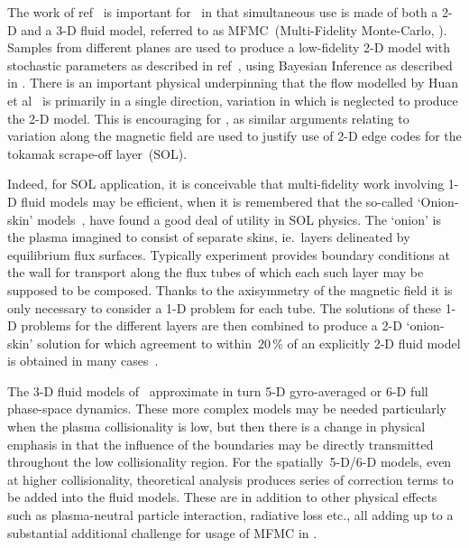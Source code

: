 The work of ref~\cite{Hu18Glob} is important for \nep\ in that simultaneous use is made
of both a 2-D and a 3-D fluid model, referred to as MFMC~(Multi-Fidelity Monte-Carlo, ).
Samples from different planes are used to produce a low-fidelity 2-D model with stochastic parameters
as described in ref~\cite[\S\,4.1]{Hu18Glob}, using Bayesian Inference as described in .
There is an important physical underpinning that the flow modelled by Huan et al~\cite{Hu18Glob}
is primarily in a single direction, variation in which is neglected to produce
the 2-D model. This is encouraging for \nep, as similar arguments relating to
variation along the magnetic field are used to justify use of 2-D edge codes for
the tokamak scrape-off layer~(SOL).

Indeed, for SOL application, it is conceivable that multi-fidelity work involving 1-D
fluid models may be efficient, when it is remembered that the so-called `Onion-skin' models~\cite{St97Code},
have found a good deal of utility in SOL physics. The `onion' is the plasma
imagined to consist of separate skins, ie.\ layers delineated by equilibrium flux surfaces.
Typically experiment provides boundary conditions at the wall for transport along
the flux tubes of which each such layer may be supposed to be composed. Thanks to the axisymmetry 
of the magnetic field it is only necessary to consider a 1-D problem for each tube. The solutions
of these 1-D problems for the different layers are then combined to produce a 2-D
`onion-skin' solution for which agreement to within~$20$\,\% of an explicitly 2-D fluid  model
is obtained in many cases~\cite{St97Code}.


The 3-D fluid models of \nep\ approximate in turn 5-D gyro-averaged or 6-D full phase-space dynamics.
These more complex models may be needed particularly when the plasma collisionality
is low, but then there is a change in physical emphasis in that the influence of the
boundaries may be directly transmitted throughout the low collisionality region.
For the spatially~5-D/6-D models, even at higher collisionality,
theoretical analysis produces series of correction terms to be added into the fluid models.
These are in addition to other physical effects such as plasma-neutral particle interaction,
radiative loss etc., all adding up to a substantial additional challenge for usage of MFMC in \nep.

